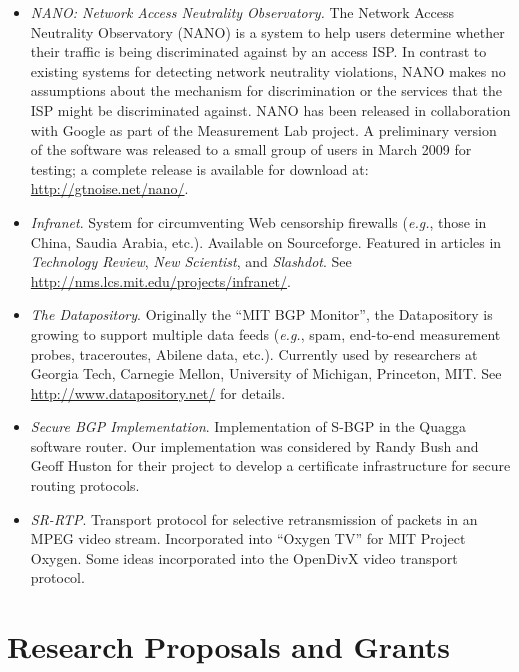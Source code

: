 \documentclass{article}
\newcommand{\eg}{{\em e.g.}}
\begin{document}
\begin{cv}{}
\begin{itemize}
\item {\em NANO: Network Access Neutrality Observatory.} The Network
  Access Neutrality Observatory (NANO) is a system to help users
  determine whether their traffic is being discriminated against by an
  access ISP.  In contrast to existing systems for detecting network
  neutrality violations, NANO makes no assumptions about the mechanism
  for discrimination or the services that the ISP might be discriminated
  against.  NANO has been released in collaboration with Google as part
  of the Measurement Lab project.  A preliminary version of the software
  was released to a small group of users in March 2009 for testing; a
  complete release is available for download at:
  \url{http://gtnoise.net/nano/}.  
%
\item {\em Infranet}.  System for circumventing Web censorship firewalls
  (\eg, those in China, Saudia Arabia, etc.).  Available on
  Sourceforge.  Featured in articles in {\em Technology Review}, {\em
  New Scientist}, and {\em Slashdot}.  See
  \url{http://nms.lcs.mit.edu/projects/infranet/}.
\item {\em The Datapository}.  Originally the ``MIT BGP Monitor'', the
  Datapository is growing to support multiple data feeds (\eg, spam,
  end-to-end measurement probes, traceroutes, Abilene data, etc.).
  Currently used by researchers at Georgia Tech, Carnegie Mellon,
  University of Michigan, Princeton, MIT.  See
  \url{http://www.datapository.net/} for details.
%
\item {\em Secure BGP Implementation}.  Implementation of S-BGP in the
  Quagga software router.  Our implementation was considered by Randy Bush
  and Geoff Huston for their project to develop a certificate
  infrastructure for secure routing protocols.
%
\item {\em SR-RTP}.  Transport protocol for selective retransmission of
  packets in an MPEG video stream.  Incorporated into ``Oxygen TV'' for
  MIT Project Oxygen.  Some ideas incorporated into the OpenDivX
  video transport protocol.
\end{itemize}

\section*{Research Proposals and Grants}
\label{subsec:research}

\def\funding#1#2#3#4#5{\item{{{\bf #1}}
\newline Sponsor: {#2}
\newline Investigator(s): {#3}
\newline Amount: {\sl #4}
\newline {\sl #5}}}


\end{cv}
\end{document}
